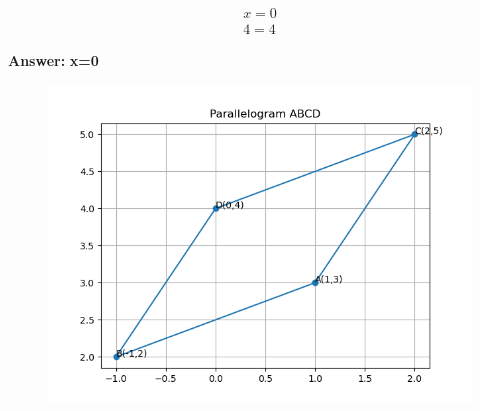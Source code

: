 \documentclass[journal]{IEEEtran}
\begin{document}
\begin{align}
    x=0  \\
    4=4
\end{align}

\textbf{Answer:}  
\textbf{x=0}

\begin{figure}[h!]
    \centering
    \includegraphics[height=0.5\textheight, keepaspectratio]{figs/plotc.png}
    \label{figure_1}
\end{figure}
\end{document}
